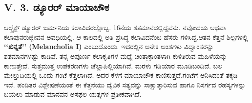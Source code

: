 \subsection*{V. 3. ಡ್ಯೂರರ್ ಮಾಯಾಚೌಕ}

ಆಲ್ಬ್ರೆಕ್ಟ್ ಡ್ಯೂರರ್ ಜರ್ಮನಿಯ ಕಲಾವಿದರಲ್ಲೊಬ್ಬ. 16ನೆಯ ಶತಮಾನದಲ್ಲಿದ್ದವನು. ನವೋದಯ ಅಥವಾ ಕಲಾಪುನರುಜ್ಜೀವನ ಅವಧಿಯಲ್ಲಿ. ಆ ಕಾಲದಲ್ಲಿ ಅತಿ ಪ್ರಸಿದ್ಧ ಕಲಾವಿದನೆಂಬ ಹೆಸರು ಗಳಿಸಿದ್ದ.ಆತನ ಕೆತ್ತನೆ ಶಿಲ್ಪಗಳಲ್ಲಿ \textbf{‘‘ಖಿನ್ನತೆ’’ (Melancholia I)} ಎಂಬುದೊಂದು. ಇದರಲ್ಲಿನ ಅನೇಕ ಅಂಶಗಳು ವಿದ್ವಾಂಸರನ್ನು ಶತಮಾನಗಳಷ್ಟು ಕಾಡಿವೆ. ತನ್ನ ಅಪೂರ್ಣ ಕಲಾಕೃತಿಗಳ ಮಧ್ಯೆ ಚಿಂತಾಕ್ರಾಂತಳಾಗಿ ಕುಳಿತಿರುವ ಮಹಿಳೆಯನ್ನು ಕಾಣುತ್ತೇವೆ. ಸುತ್ತಮುತ್ತ ಉಪಕರಣಗಳು ಚೆಲ್ಲಾಪಿಲ್ಲಿಯಾಗಿವೆ. ಮರಳು ಗಡಿಯಾರ ಮೂಡಿಬಂದಿದೆ. ಬಲ ಮೇಲ್ತುದಿಯಲ್ಲಿ ಒಂದು ಗಂಟೆ ಕೆತ್ತಲಾಗಿದೆ. ಅದರ ಕೆಳಗೆ ಮಾಯಾಚೌಕ ಕಾಣಿಸುತ್ತದೆ.\break ಗಂಟೆಗೆ ಆನಿಸಿದಂತೆ ತಕ್ಕಡಿ ಇದೆ. ಪಂಡಿತರ ವಿಶ್ಲೇಷಣೆಯಂತೆ ಈ ಕೆತ್ತನೆಯು ದೈವಿಕ ಸತ್ಯವನ್ನು ಸಾಕ್ಷಾತ್ಕಾರಿಸುವ ಹಾಗೂ ನಿಸರ್ಗದ ರಹಸ್ಯಗಳನ್ನು ಬಯಲು ಮಾಡುವ ಮಾನವನ ಅಸಫಲ ಯತ್ನಗಳ ಪ್ರತೀಕವಾಗಿದೆ.

